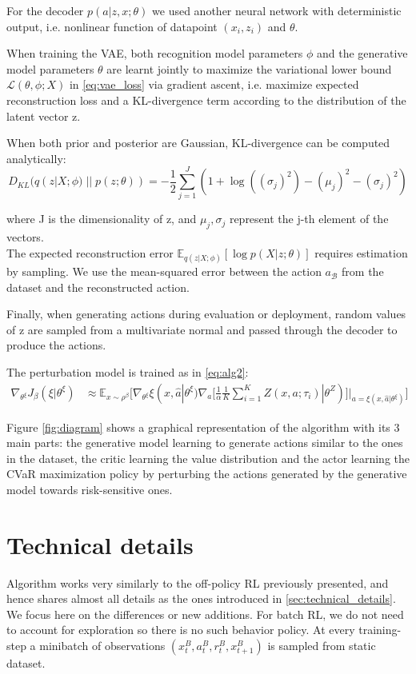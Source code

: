 For the decoder $p(a|z,x; \theta)$ we used another neural network with deterministic output, i.e. nonlinear function of 
datapoint $(x_i,z_i)$ and $\theta$.

When training the VAE, both recognition model parameters $\phi$ and the generative model parameters $\theta$ are
learnt jointly to maximize the variational lower bound $\mathcal{L}(\theta, \phi; X)$ in \ref{eq:vae_loss} 
via gradient ascent, i.e. maximize expected reconstruction loss and a KL-divergence term
according to the distribution of the latent vector z.

When both prior and posterior are Gaussian, KL-divergence can be computed analytically:
\begin{equation}
    D_{KL}(q(z|X;\phi)\; ||\;p(z; \theta)) = -\frac{1}{2}\sum_{j=1}^J (1+\log((\sigma_j)^2)-(\mu_j)^2-(\sigma_j)^2) \label{eq:kl_div}
\end{equation}

where J is the dimensionality of z, and $\mu_j,\sigma_j$ represent the j-th element of the vectors.\\
The expected reconstruction error 
$\mathbb E_{q(z|X;\phi)} [\log p(X|z; \theta)]$
requires estimation by sampling. We use the mean-squared error between the action $a_\mathcal{B}$
from the dataset and the reconstructed action.

Finally, when generating actions during evaluation or deployment, random values of z are sampled from a
multivariate normal and passed through the decoder to produce the actions.



The perturbation model is trained as in \ref{eq:alg2}:
\begin{align}
    \nabla_{\theta^\xi} J_\beta(\xi | \theta^\xi) &\approx \mathbb E_{x \sim \rho^\beta} 
\big [\nabla_{\theta^\xi} \xi(x,\hat{a}| \theta^\xi) \nabla_a  [\frac{1}{\alpha} \frac{1}{K}
\sum_{i=1}^K Z(x,a; \tau_i) | \theta^Z)]|_{a=\xi(x,\hat{a}| \theta^\xi)}  \big] \label{eq:algbatchrl_2}
\end{align}

Figure \ref{fig:diagram} shows a graphical representation of the algorithm with its 3 main parts:
the generative model learning to generate actions similar to the ones in the dataset,
the critic learning the value distribution and the actor learning the CVaR maximization policy
by perturbing the actions generated by the generative model towards risk-sensitive ones.


\section{Technical details}
Algorithm works very similarly to the off-policy RL previously presented, and hence shares almost all details
as the ones introduced in \ref{sec:technical_details}.
We focus here on the differences or new additions.
For batch RL, we do not need to account for exploration so there is no such behavior policy.
At every training-step a minibatch of observations  $(x_t^B,a_t^B,r_t^B,x_{t+1}^B)$ is sampled from
static dataset.

